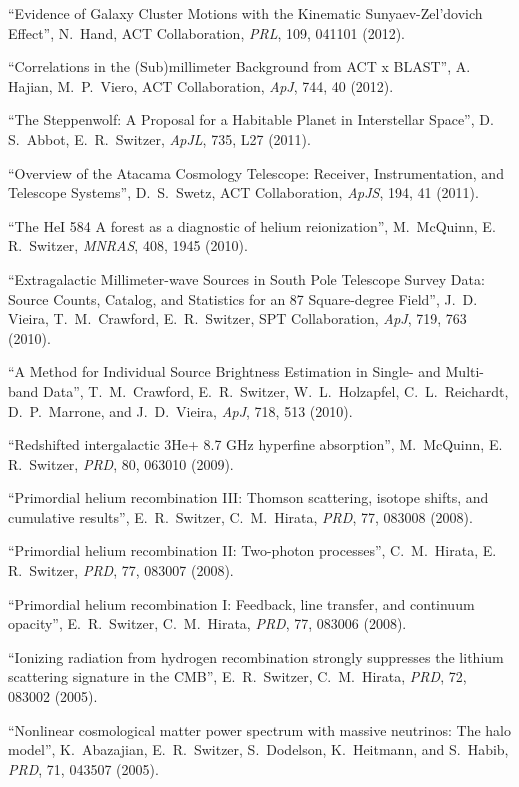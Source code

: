 \item ``Evidence of Galaxy Cluster Motions with the Kinematic Sunyaev-Zel'dovich Effect'', N.\, Hand, ACT Collaboration, {\it PRL}, 109, 041101 (2012).
\item ``Correlations in the (Sub)millimeter Background from ACT x BLAST'', A.\, Hajian, M.\, P.\, Viero, ACT Collaboration, {\it ApJ}, 744, 40 (2012).
\item ``The Steppenwolf: A Proposal for a Habitable Planet in Interstellar Space'', D.\, S.\, Abbot, E.\, R.\, Switzer, {\it ApJL}, 735, L27 (2011).
\item ``Overview of the Atacama Cosmology Telescope: Receiver, Instrumentation, and Telescope Systems'', D.\, S.\, Swetz, ACT Collaboration, {\it ApJS}, 194, 41 (2011).
\item ``The HeI 584 A forest as a diagnostic of helium reionization'', M.\, McQuinn, E.\, R.\, Switzer, {\it MNRAS}, 408, 1945 (2010).
\item ``Extragalactic Millimeter-wave Sources in South Pole Telescope Survey Data: Source Counts, Catalog, and Statistics for an 87 Square-degree Field'', J.\, D.\, Vieira, T.\, M.\, Crawford, E.\, R.\, Switzer, SPT Collaboration, {\it ApJ}, 719, 763 (2010).
\item ``A Method for Individual Source Brightness Estimation in Single- and Multi-band Data'', T.\, M.\, Crawford, E.\, R.\, Switzer, W.\, L.\, Holzapfel, C.\, L.\, Reichardt, D.\, P.\, Marrone, and J.\, D.\, Vieira, {\it ApJ}, 718, 513 (2010).
\item ``Redshifted intergalactic 3He+ 8.7 GHz hyperfine absorption'', M.\, McQuinn, E.\, R.\, Switzer, {\it PRD}, 80, 063010 (2009).
\item ``Primordial helium recombination III: Thomson scattering, isotope shifts, and cumulative results'', E.\, R.\, Switzer, C.\, M.\, Hirata, {\it PRD}, 77, 083008 (2008).
\item ``Primordial helium recombination II: Two-photon processes'', C.\, M.\, Hirata, E.\, R.\, Switzer, {\it PRD}, 77, 083007 (2008).
\item ``Primordial helium recombination I: Feedback, line transfer, and continuum opacity'', E.\, R.\, Switzer, C.\, M.\, Hirata, {\it PRD}, 77, 083006 (2008).
\item ``Ionizing radiation from hydrogen recombination strongly suppresses the lithium scattering signature in the CMB'', E.\, R.\, Switzer, C.\, M.\, Hirata, {\it PRD}, 72, 083002 (2005).
\item ``Nonlinear cosmological matter power spectrum with massive neutrinos: The halo model'', K.\, Abazajian, E.\, R.\, Switzer, S.\, Dodelson, K.\, Heitmann, and S.\, Habib, {\it PRD}, 71, 043507 (2005).
